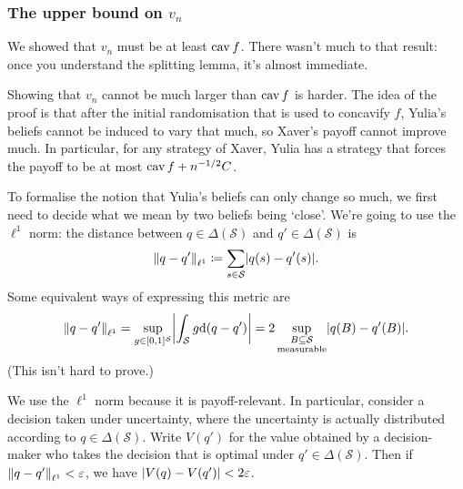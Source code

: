 \documentclass[11pt,letterpaper,reqno,oneside]{article}
\begin{document}
\subsubsection{The upper bound on \texorpdfstring{$v_n$}{vn}}
\label{sec:learning:AumannMaschler:second_ineq}

We showed that $v_n$ must be at least $\cav f$. There wasn't much to that result: once you understand the splitting lemma, it's almost immediate.

Showing that $v_n$ cannot be much larger than $\cav f$ is harder. The idea of the proof is that after the initial randomisation that is used to concavify $f$, Yulia's beliefs cannot be induced to vary that much, so Xaver's payoff cannot improve much. In particular, for any strategy of Xaver, Yulia has a strategy that forces the payoff to be at most $\cav f + n^{-1/2} C$.

To formalise the notion that Yulia's beliefs can only change so much, we first need to decide what we mean by two beliefs being `close'. We're going to use the $\ell^1$ norm: the distance between $q \in \Delta(\mathcal{S})$ and $q' \in \Delta(\mathcal{S})$ is 
%
\begin{equation*}
	\norm*{ q - q' }_{\ell^1}
	\coloneqq \sum_{s \in \mathcal{S}} \abs*{ q(s) - q'(s) } .
\end{equation*}
%
Some equivalent ways of expressing this metric are
%
\begin{equation*}
	\norm*{ q - q' }_{\ell^1}
	= \sup_{ g \in [0,1]^\mathcal{S} }
	\abs*{ \int_\mathcal{S} g \dd(q-q') }
	= 2 \sup_{ \substack{ B \subseteq \mathcal{S} \\ \text{measurable} } } 
	\abs*{ q(B) - q'(B) } .
\end{equation*}
%
(This isn't hard to prove.)

We use the $\ell^1$ norm because it is payoff-relevant. In particular, consider a decision taken under uncertainty, where the uncertainty is actually distributed according to $q \in \Delta(\mathcal{S})$. Write $V(q')$ for the value obtained by a decision-maker who takes the decision that is optimal under $q' \in \Delta(\mathcal{S})$. Then if $\norm*{ q - q' }_{\ell^1} < \eps$, we have $\abs*{ V(q) - V(q') } < 2\eps$.
\end{document}
